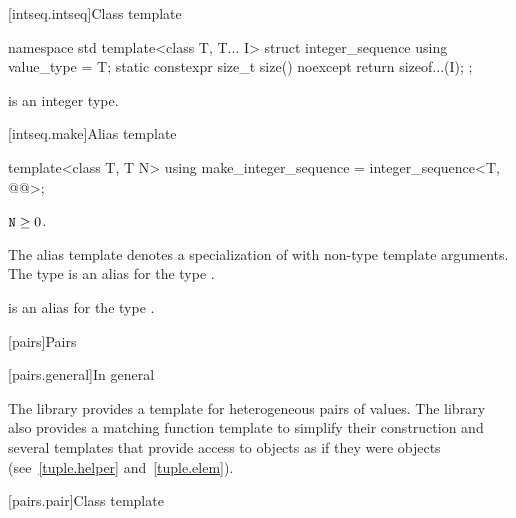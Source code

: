 [intseq.intseq]{Class template }

%
%
\begin{codeblock}
namespace std {
  template<class T, T... I> struct integer_sequence {
    using value_type = T;
    static constexpr size_t size() noexcept { return sizeof...(I); }
  };
}
\end{codeblock}

\pnum
\mandates
{} is an integer type.

[intseq.make]{Alias template }

%
\begin{itemdecl}
template<class T, T N>
  using make_integer_sequence = integer_sequence<T, @\seebelow{}@>;
\end{itemdecl}

\begin{itemdescr}
\pnum
\mandates
$\texttt{N} \geq 0$.

\pnum
The alias template
 denotes a specialization of
 with  non-type template arguments.
The type  is an alias for the type
.
\begin{note}
 is an alias for the type
.
\end{note}
\end{itemdescr}

[pairs]{Pairs}

[pairs.general]{In general}

\pnum
The library provides a template for heterogeneous pairs of values.
The library also provides a matching function template to simplify
their construction and several templates that provide access to 
objects as if they were  objects (see~\ref{tuple.helper}
and~\ref{tuple.elem}).%
%
%
%

[pairs.pair]{Class template }

